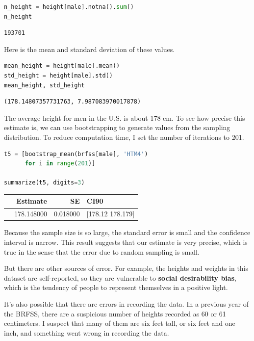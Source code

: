 \begin{lstlisting}[language=Python,style=source]
n_height = height[male].notna().sum()
n_height
\end{lstlisting}

\begin{lstlisting}[style=output]
193701
\end{lstlisting}

Here is the mean and standard deviation of these values.

\begin{lstlisting}[language=Python,style=source]
mean_height = height[male].mean()
std_height = height[male].std()
mean_height, std_height
\end{lstlisting}

\begin{lstlisting}[style=output]
(178.14807357731763, 7.987083970017878)
\end{lstlisting}

The average height for men in the U.S. is about 178 cm. To see how
precise this estimate is, we can use bootstrapping to generate values
from the sampling distribution. To reduce computation time, I set the
number of iterations to 201.

\begin{lstlisting}[language=Python,style=source]
t5 = [bootstrap_mean(brfss[male], 'HTM4')
      for i in range(201)]

summarize(t5, digits=3)
\end{lstlisting}

\begin{tabular}{lrrl}
\midrule
 & Estimate & SE & CI90 \\
\midrule
 & 178.148000 & 0.018000 & [178.12  178.179] \\
\midrule
\end{tabular}

Because the sample size is so large, the standard error is small and the
confidence interval is narrow. This result suggests that our estimate is
very precise, which is true in the sense that the error due to random
sampling is small.

But there are other sources of error. For example, the heights and
weights in this dataset are self-reported, so they are vulnerable to
\textbf{social desirability bias}, which is the tendency of people to
represent themselves in a positive light.

It's also possible that there are errors in recording the data. In a
previous year of the BRFSS, there are a suspicious number of heights
recorded as 60 or 61 centimeters. I suspect that many of them are six
feet tall, or six feet and one inch, and something went wrong in
recording the data.

